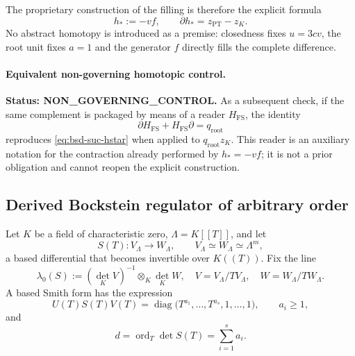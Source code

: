 The proprietary construction of the filling is therefore the explicit formula
\begin{equation}\label{eq:bsd-suc-hstar}
 h_*:=-vf,
 \qquad
 \partial h_*=z_{\mathrm{PT}}-z_K.
\end{equation}
No abstract homotopy is introduced as a premise: closedness fixes
\(u=3cv\), the root unit fixes \(a=1\) and the generator \(f\) directly
fills the complete difference.

\paragraph{Equivalent non-governing homotopic control.}
\noindent\textbf{Status: NON\_GOVERNING\_CONTROL.}
As a subsequent check, if the same complement is packaged by means of
a reader \(H_{\mathrm{FS}}\), the identity
\begin{equation}\label{eq:bsd-suc-hfs}
 \partial H_{\mathrm{FS}}+H_{\mathrm{FS}}\partial
 =q_{\mathrm{root}}
\end{equation}
reproduces \eqref{eq:bsd-suc-hstar} when applied to
\(q_{\mathrm{root}}z_K\). This reader is an auxiliary notation for the
contraction already performed by \(h_*=-vf\); it is not a prior obligation and
cannot reopen the explicit construction.

\subsection*{Derived Bockstein regulator of arbitrary order}

Let \(K\) be a field of characteristic zero,
\(\Lambda=K[[T]]\), and let
\begin{equation}\label{eq:bsd-suc-S}
 S(T):V_{\Lambda}\longrightarrow W_{\Lambda},
 \qquad
 V_{\Lambda}\simeq W_{\Lambda}\simeq\Lambda^{m},
\end{equation}
a based differential that becomes invertible over \(K((T))\). Fix
the line
\begin{equation}\label{eq:bsd-suc-lambda0}
 \lambda_0(S):=(\det_K V)^{-1}\otimes_K\det_K W,
 \quad
 V=V_{\Lambda}/TV_{\Lambda},\quad
 W=W_{\Lambda}/TW_{\Lambda}.
\end{equation}
A based Smith form has the expression
\begin{equation}\label{eq:bsd-suc-smith}
 U(T)S(T)V(T)
 =\operatorname{diag}
 \bigl(T^{a_1},\ldots,T^{a_s},1,\ldots,1\bigr),
 \qquad a_i\geq1,
\end{equation}
and
\begin{equation}\label{eq:bsd-suc-orden}
 d=\operatorname{ord}_{T}\det S(T)=\sum_{i=1}^{s}a_i.
\end{equation}

